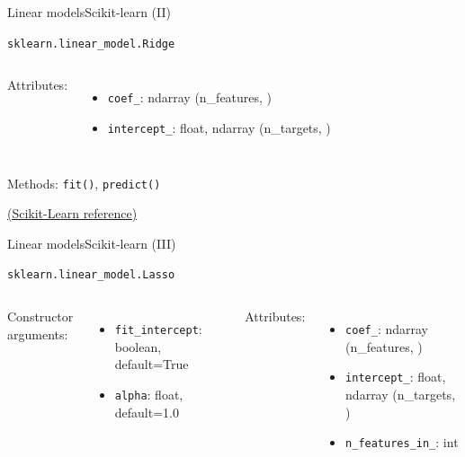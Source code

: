 \documentclass[10pt,compress]{beamer} %
\begin{document}
{\begin{frame}{Linear models}{Scikit-learn (II)}
\begin{exampleblock}{\texttt{sklearn.linear\_model.Ridge}}
\begin{columns}[T]
                Attributes:
                \begin{itemize}
                    \item \texttt{coef\_}:  ndarray (n\_features, )
                    \item \texttt{intercept\_}:  float, ndarray (n\_targets, )
                \end{itemize}
            \end{columns}

            \medskip

            Methods: \texttt{fit()}, \texttt{predict()}
        \end{exampleblock}

        \medskip
        \centering \href{https://scikit-learn.org/stable/modules/generated/sklearn.linear_model.Ridge.html}{(Scikit-Learn reference)}
    \end{frame}

    \begin{frame}{Linear models}{Scikit-learn (III)}
        \begin{exampleblock}{\texttt{sklearn.linear\_model.Lasso}}
         \medskip

         \begin{columns}[T]
                Constructor arguments:
                \begin{itemize}
                    \item \texttt{fit\_intercept}: boolean, default=True
                    \item \texttt{alpha}: float, default=1.0
                \end{itemize}

                Attributes:
                \begin{itemize}
                    \item \texttt{coef\_}:  ndarray (n\_features, )
                    \item \texttt{intercept\_}:  float, ndarray (n\_targets, )
                    \item \texttt{n\_features\_in\_}: int
                \end{itemize}
            \end{columns}

            \medskip


\end{exampleblock}
\end{frame}}
\end{document}
